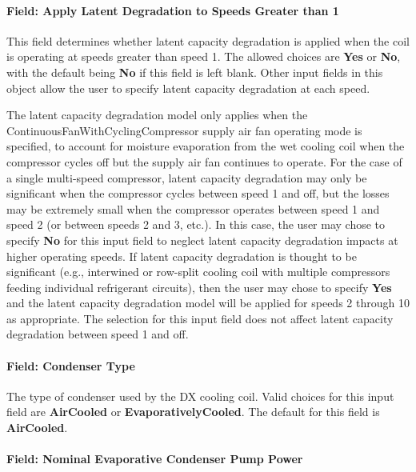\paragraph{Field: Apply Latent Degradation to Speeds Greater than 1}\label{field-apply-latent-degradation-to-speeds-greater-than-1}

This field determines whether latent capacity degradation is applied when the coil is operating at speeds greater than speed 1. The allowed choices are \textbf{Yes} or \textbf{No}, with the default being \textbf{No} if this field is left blank. Other input fields in this object allow the user to specify latent capacity degradation at each speed.

The latent capacity degradation model only applies when the ContinuousFanWithCyclingCompressor supply air fan operating mode is specified, to account for moisture evaporation from the wet cooling coil when the compressor cycles off but the supply air fan continues to operate. For the case of a single multi-speed compressor, latent capacity degradation may only be significant when the compressor cycles between speed 1 and off, but the losses may be extremely small when the compressor operates between speed 1 and speed 2 (or between speeds 2 and 3, etc.). In this case, the user may chose to specify \textbf{No} for this input field to neglect latent capacity degradation impacts at higher operating speeds. If latent capacity degradation is thought to be significant (e.g., interwined or row-split cooling coil with multiple compressors feeding individual refrigerant circuits), then the user may chose to specify \textbf{Yes} and the latent capacity degradation model will be applied for speeds 2 through 10 as appropriate. The selection for this input field does not affect latent capacity degradation between speed 1 and off.

\paragraph{Field: Condenser Type}\label{field-condenser-type-3}

The type of condenser used by the DX cooling coil. Valid choices for this input field are \textbf{AirCooled} or \textbf{EvaporativelyCooled}. The default for this field is \textbf{AirCooled}.

\paragraph{Field: Nominal Evaporative Condenser Pump Power}\label{field-nominal-evaporative-condenser-pump-power-1}

